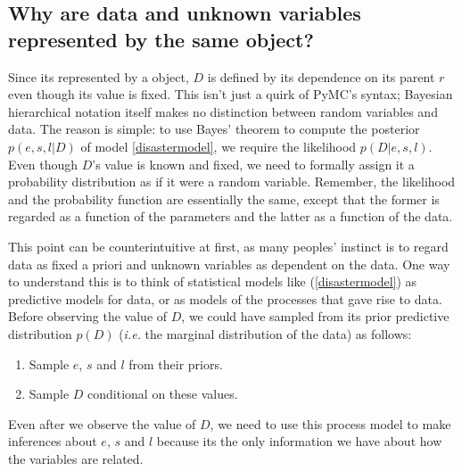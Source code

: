 \subsection{Why are data and unknown variables represented by the same
object?}
Since its represented by a  object, $D$ is defined by its dependence on its parent $r$ even though its value is fixed. This isn't just a quirk of PyMC's syntax; Bayesian hierarchical notation itself makes no distinction between random variables and data. The reason is simple: to use Bayes' theorem to compute the posterior $p(e,s,l|D)$ of model \ref{disastermodel}, we require the likelihood $p(D|e,s,l)$. Even though $D$'s value is known and fixed, we need to formally assign it a probability distribution as if it were a random variable. Remember, the likelihood and the probability function are essentially the same, except that the former is regarded as a function of the parameters and the latter as a function of the data.

This point can be counterintuitive at first, as many peoples' instinct is to regard data as fixed a priori and unknown variables as dependent on the data. One way to understand this is to think of statistical models like (\ref{disastermodel}) as predictive models for data, or as models of the processes that gave rise to data. Before observing the value of $D$, we could have sampled from its prior predictive distribution $p(D)$ (\emph{i.e.} the marginal distribution of the data) as follows:
\begin{enumerate}
    \item Sample $e$, $s$ and $l$ from their priors.
    \item Sample $D$ conditional on these values.
\end{enumerate}
Even after we observe the value of $D$, we need to use this process model to make inferences about $e$, $s$ and $l$ because its the only information we have about how the variables are related.

%


